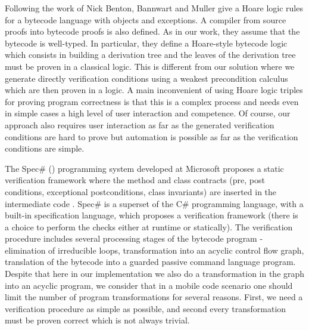 Following the work of Nick Benton, Bannwart and Muller \cite{BM05plb} give  a Hoare logic rules
for a bytecode language with objects and  exceptions. A compiler from source proofs into bytecode proofs is also defined. 
As in our work, they assume that the bytecode is well-typed. 
In particular, they define a Hoare-style bytecode logic which consists in building a derivation tree 
and the leaves of the derivation tree must be proven in a classical logic. This is different from our solution
where we generate directly  verification conditions using a weakest precondition calculus which are then proven in a logic.
 A main inconvenient of using  Hoare logic triples for proving program correctness is that this is  
  a complex process and needs even in simple cases a high level of user interaction and competence. Of course, our approach
 also requires user interaction as far as the generated verification conditions are hard to prove but automation 
 is possible as far as the verification conditions are simple.
  



 The Spec\# (\cite{BLS04sp}) programming system developed at Microsoft proposes a static verification framework where 
 the method and class contracts  (pre, post conditions, exceptional postconditions, class invariants) are inserted in the intermediate code . 
 Spec\# is a superset of the C\# programming language, with a built-in  specification language, 
 which proposes a verification framework (there is a choice to perform the checks either at runtime or statically). 
 The verification procedure \cite{leinoWPUP} includes several processing stages of the bytecode program -  
 elimination of irreducible loops, transformation into an acyclic control flow graph,
 translation of the bytecode into a guarded passive command language program. Despite that here in our implementation we also
 do a transformation in the graph into an acyclic program, we consider that in a mobile code scenario
 one should limit the number of program transformations for several reasons.
 First, we need a verification procedure as simple as possible, and second every transformation must be proven correct which is not always trivial.      

